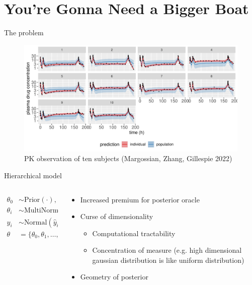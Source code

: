 \documentclass[bigger]{beamer}
\begin{document}
\section{You're Gonna Need a Bigger Boat}
\label{sec:org0be5a07}
\begin{frame}[label={sec:org62f3674}]{The problem}
\begin{figure}[htbp]
\centering
\includegraphics[width=\textwidth]{./figure/twocpt_pop_ppc1.pdf}
\caption{PK observation of ten subjects (Margossian, Zhang, Gillespie 2022)}
\end{figure}
\end{frame}

\begin{frame}[label={sec:org549deca}]{Hierarchical model}
\begin{columns}
\begin{column}{0.4\columnwidth}
\begin{align*}
\theta_0 &\sim \text{Prior}(\cdot),\\
\theta_i &\sim \text{MultiNormal}(\theta_0, \Sigma),\\
y_i &\sim \text{Normal}(\hat{y}_i(\theta_i), \sigma),\\
\theta &= \{\theta_0, \theta_1, \dots, \theta_n, \Sigma\}
\end{align*}
\end{column}

\begin{column}{0.6\columnwidth}
\begin{itemize}
\item <1-> Increased premium for posterior oracle
\item <2-> Curse of dimensionality
\begin{itemize}
\item <2-> Computational tractability
\item <3-> Concentration of measure (e.g. high dimensional gaussian distribution is like uniform distribution)
\end{itemize}
\item <4-> Geometry of posterior
\end{itemize}
\end{column}
\end{columns}
\end{frame}
\end{document}
